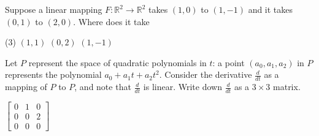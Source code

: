 \begin{exercise}\ansMark%
Suppose a linear mapping $F \colon {\mathbb R}^2 \to {\mathbb R}^2$
takes $(1,0)$ to $(1,-1)$ and it takes $(0,1)$ to $(2,0)$. 
Where does it take
\begin{tasks}(3)
\task
$(1,1)$
\task
$(0,2)$
\task
$(1,-1)$
\end{tasks}
\end{exercise}

\begin{exercise}[challenging]
Let $P$ represent the space of quadratic polynomials
in $t$: a point $(a_0,a_1,a_2)$ in $P$ represents
the polynomial $a_0 + a_1 t + a_2 t^2$.
Consider the derivative $\frac{d}{dt}$ as a mapping of $P$ to
$P$,
and note that $\frac{d}{dt}$ is linear.
Write down $\frac{d}{dt}$ as a $3 \times 3$ matrix.
\end{exercise}
\comboSol{%
}
{%
$\left[\begin{smallmatrix} 0 & 1 & 0 \\ 0 & 0 & 2 \\ 0 & 0 & 0 \end{smallmatrix}\right]$
}

\setcounter{exercise}{100}
